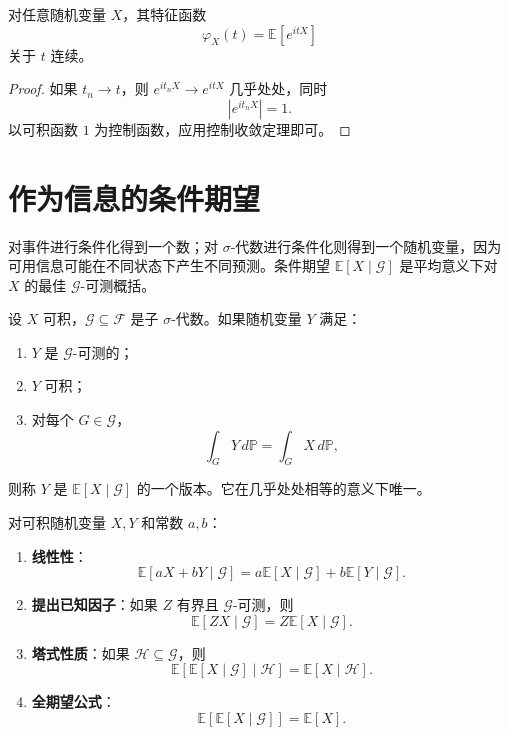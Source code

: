\begin{corollary}[特征函数的连续性]
对任意随机变量 $X$，其特征函数
\[
    \varphi_X(t)=\mathbb{E}[e^{itX}]
\]
关于 $t$ 连续。
\end{corollary}

\begin{proof}
如果 $t_n\to t$，则 $e^{it_nX}\to e^{itX}$ 几乎处处，同时
\[
    |e^{it_nX}|=1.
\]
以可积函数 $1$ 为控制函数，应用控制收敛定理即可。
\end{proof}

\section{作为信息的条件期望}

对事件进行条件化得到一个数；对 $\sigma$-代数进行条件化则得到一个随机变量，因为可用信息可能在不同状态下产生不同预测。条件期望 $\mathbb{E}[X\mid\mathcal{G}]$ 是平均意义下对 $X$ 的最佳 $\mathcal{G}$-可测概括。

\begin{definition}[条件期望]
设 $X$ 可积，$\mathcal{G}\subseteq\mathcal{F}$ 是子 $\sigma$-代数。如果随机变量 $Y$ 满足：
\begin{enumerate}
    \item $Y$ 是 $\mathcal{G}$-可测的；
    \item $Y$ 可积；
    \item 对每个 $G\in\mathcal{G}$，
    \[
        \int_GY\,d\mathbb{P}=\int_GX\,d\mathbb{P},
    \]
\end{enumerate}
则称 $Y$ 是 $\mathbb{E}[X\mid\mathcal{G}]$ 的一个版本。它在几乎处处相等的意义下唯一。
\end{definition}

\begin{theorem}[基本性质]
对可积随机变量 $X,Y$ 和常数 $a,b$：
\begin{enumerate}
    \item \textbf{线性性}：
    \[
        \mathbb{E}[aX+bY\mid\mathcal{G}]
        =a\mathbb{E}[X\mid\mathcal{G}]
        +b\mathbb{E}[Y\mid\mathcal{G}].
    \]
    \item \textbf{提出已知因子}：如果 $Z$ 有界且 $\mathcal{G}$-可测，则
    \[
        \mathbb{E}[ZX\mid\mathcal{G}]
        =Z\mathbb{E}[X\mid\mathcal{G}].
    \]
    \item \textbf{塔式性质}：如果 $\mathcal{H}\subseteq\mathcal{G}$，则
    \[
        \mathbb{E}[\mathbb{E}[X\mid\mathcal{G}]\mid\mathcal{H}]
        =\mathbb{E}[X\mid\mathcal{H}].
    \]
    \item \textbf{全期望公式}：
    \[
        \mathbb{E}[\mathbb{E}[X\mid\mathcal{G}]]=\mathbb{E}[X].
    \]
\end{enumerate}
\end{theorem}

